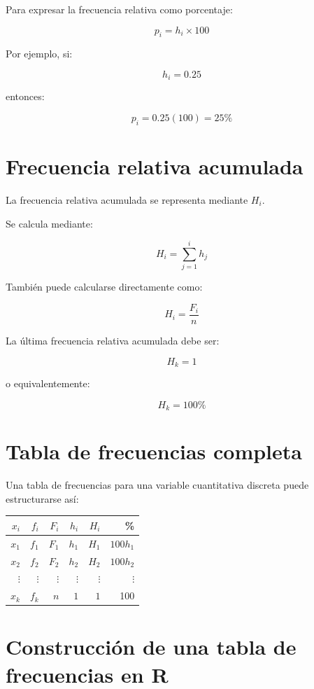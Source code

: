 \documentclass[
  spanish,
  14pt,
  letterpaper,
  DIV=11,
  numbers=noendperiod]{scrartcl}
\newcounter{none} %
\begin{document}
Para expresar la frecuencia relativa como porcentaje:

\[
p_i=h_i\times100
\]

Por ejemplo, si:

\[
h_i=0.25
\]

entonces:

\[
p_i=0.25(100)=25\%
\]

\section{Frecuencia relativa
acumulada}\label{frecuencia-relativa-acumulada}

La frecuencia relativa acumulada se representa mediante \(H_i\).

Se calcula mediante:

\[
H_i=\sum_{j=1}^{i}h_j
\]

También puede calcularse directamente como:

\[
H_i=\frac{F_i}{n}
\]

La última frecuencia relativa acumulada debe ser:

\[
H_k=1
\]

o equivalentemente:

\[
H_k=100\%
\]

\section{Tabla de frecuencias
completa}\label{tabla-de-frecuencias-completa}

Una tabla de frecuencias para una variable cuantitativa discreta puede
estructurarse así:

{\def\LTcaptype{none} %
\begin{longtable}[]{@{}rrrrrr@{}}
\toprule\noalign{}
\(x_i\) & \(f_i\) & \(F_i\) & \(h_i\) & \(H_i\) & \% \\
\midrule\noalign{}
\endhead
\bottomrule\noalign{}
\endlastfoot
\(x_1\) & \(f_1\) & \(F_1\) & \(h_1\) & \(H_1\) & \(100h_1\) \\
\(x_2\) & \(f_2\) & \(F_2\) & \(h_2\) & \(H_2\) & \(100h_2\) \\
\(\vdots\) & \(\vdots\) & \(\vdots\) & \(\vdots\) & \(\vdots\) &
\(\vdots\) \\
\(x_k\) & \(f_k\) & \(n\) & \(1\) & \(1\) & 100 \\
\end{longtable}
}

\section{Construcción de una tabla de frecuencias en
R}\label{construcciuxf3n-de-una-tabla-de-frecuencias-en-r}
\end{document}
